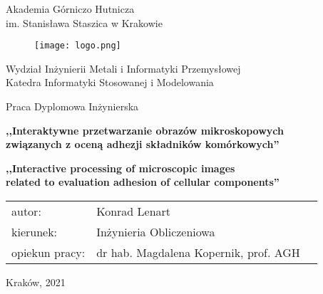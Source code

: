 \begin{titlepage}
    \begin{center}

        \vspace*{1cm}
        
        {
            \LARGE
            Akademia Górniczo Hutnicza\\
            \vspace{0.2cm}
            im. Stanisława Staszica w Krakowie
        }

        \vspace{0.5cm}

        \begin{figure}[h]
            \centering
            \texttt{[image: logo.png]}
        \end{figure}

        \vspace{0.5cm}

        {
            \LARGE
            Wydział Inżynierii Metali i Informatyki Przemysłowej\\
            \vspace{0.2cm}
            Katedra Informatyki Stosowanej i Modelowania
        }

        \vspace{0.5cm}

        {
            \LARGE
            Praca Dyplomowa Inżynierska
        }

        \vspace{0.5cm}

        {
            \Large
            \textbf{,,Interaktywne przetwarzanie obrazów mikroskopowych\\
            związanych z oceną adhezji składników komórkowych''}
        }

        \vspace{0.5cm}

        {
            \Large
            \textbf{,,Interactive processing of microscopic images\\
            related to evaluation adhesion of cellular components''}
        }

        \vfill

        \begin{flushleft}
        {
            \Large
            \begin{tabular}{ l l c }
                autor: & Konrad Lenart\\
                kierunek: & Inżynieria Obliczeniowa\\
                opiekun pracy: & dr hab. Magdalena Kopernik, prof. AGH
            \end{tabular}
        }
        \end{flushleft}

        \vspace{0.5cm}

        {
            \Large
            Kraków, 2021
        }

        \vspace{1cm}

    \end{center}
\end{titlepage}